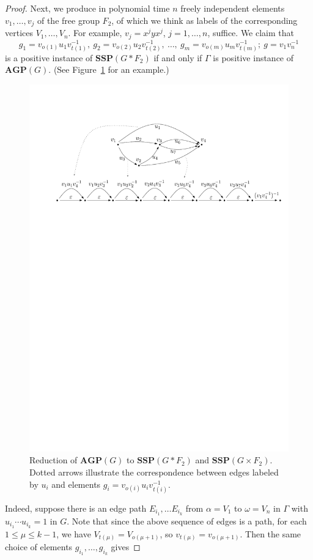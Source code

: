 \documentclass[10pt]{amsart}
\theoremstyle{definition}
\def\SSP{{\mathbf{SSP}}}
\def\AGP{{\mathbf{AGP}}}
\begin{document}
\begin{proof}
Next, we produce in polynomial time $n$ freely independent elements $v_1,\ldots, v_j$ of the free group $F_2$, of which we think as labels of the corresponding vertices $V_1,\ldots, V_n$. For example, $v_j=x^jyx^j$, $j=1,\ldots,n$, suffice.
We claim that
$$g_1 = v_{o(1)}u_1v_{t(1)}^{-1},\ g_2=v_{o(2)}u_2v_{t(2)}^{-1},\ \ldots,\ g_m=v_{o(m)}u_mv_{t(m)}^{-1};\ g=v_{1}v_{n}^{-1}
$$
is a positive instance of $\SSP(G\ast F_2)$ if and only if $\Gamma$ is positive instance of $\AGP(G)$. (See Figure~\ref{fi:agp_to_ssp} for an example.)
\begin{figure}[h]
 \centering
 \includegraphics[width=4.5in]{agp_to_ssp.pdf}
 \caption{Reduction of $\AGP(G)$ to $\SSP(G\ast F_2)$ and $\SSP(G\times F_2)$. Dotted arrows illustrate the correspondence between edges labeled by $u_i$ and elements $g_i=v_{o(i)}u_iv_{t(i)}^{-1}$.}\label{fi:agp_to_ssp}
\end{figure}
Indeed, suppose there is an edge path $E_{i_1}, \ldots E_{i_k}$ from $\alpha=V_1$ to $\omega=V_n$ in $\Gamma$ with $u_{i_1}\cdots u_{i_k}=1$ in $G$. Note that since the above sequence of edges is a path, for each $1\le \mu\le k-1$, we have $V_{t(\mu)}=V_{o(\mu+1)}$, so $v_{t(\mu)}=v_{o(\mu+1)}$. Then the same choice of elements $g_{i_1},\ldots, g_{i_k}$ gives

\end{proof}
\end{document}
